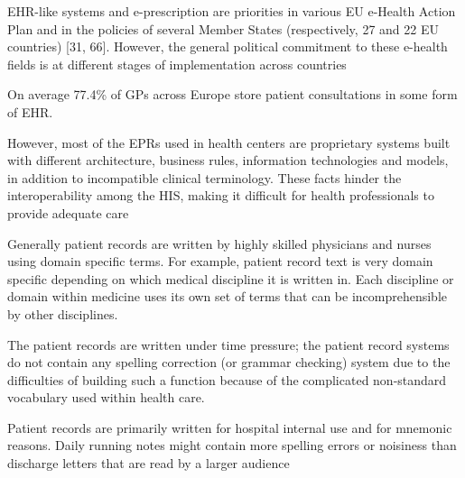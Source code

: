 EHR-like systems and e-prescription are priorities in various EU e-Health Action Plan and in the policies of several Member States (respectively, 27 and 22 EU countries) [31, 66]. However, the general political commitment to these e-health fields is at different stages of implementation across countries \cite{stroetmann2011european}

On average 77.4\% of GPs across Europe store patient consultations in some form of EHR.  
\cite{de2015basic}


However, most of the EPRs used in health centers are proprietary systems built with
different architecture, business rules, information technologies and models, in addition to incompatible clinical terminology. These facts hinder the interoperability among the HIS, making it difficult for health professionals to provide adequate care
\cite{gomes2018marcia}


Generally patient records are written by highly skilled physicians and nurses
using domain specific terms. For example, patient record text is very domain specific
depending on which medical discipline it is written in. Each discipline or domain
within medicine uses its own set of terms that can be incomprehensible by other
disciplines.
\cite{dalianis2018characteristics}

The patient records are written under time pressure; the patient record systems
do not contain any spelling correction (or grammar checking) system due to the
difficulties of building such a function because of the complicated non-standard
vocabulary used within health care.
\cite{dalianis2018characteristics}

Patient records are primarily written for hospital internal use and for mnemonic
reasons. Daily running notes might contain more spelling errors or noisiness than
discharge letters that are read by a larger audience 
\cite{ehrentraut2012detection}

